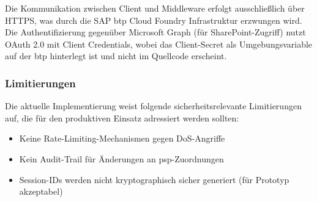 Die Kommunikation zwischen Client und Middleware erfolgt ausschließlich über HTTPS, was durch die SAP \gls{btp} Cloud Foundry Infrastruktur erzwungen wird. Die Authentifizierung gegenüber Microsoft Graph (für SharePoint-Zugriff) nutzt OAuth 2.0 mit Client Credentials, wobei das Client-Secret als Umgebungsvariable auf der \gls{btp} hinterlegt ist und nicht im Quellcode erscheint.

\subsubsection{Limitierungen}

Die aktuelle Implementierung weist folgende sicherheitsrelevante Limitierungen auf, die für den produktiven Einsatz adressiert werden sollten:

\begin{itemize}
    \item Keine Rate-Limiting-Mechanismen gegen DoS-Angriffe
    \item Kein Audit-Trail für Änderungen an \gls{psp}-Zuordnungen
    \item Session-IDs werden nicht kryptographisch sicher generiert (für Prototyp akzeptabel)
\end{itemize}
